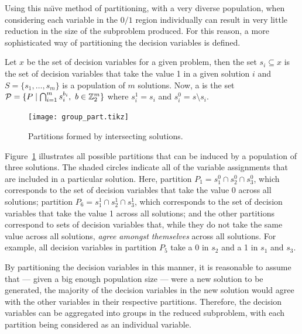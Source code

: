 \documentclass[journal]{IEEEtran}
\begin{document}
Using this na{\"\i}ve method of partitioning, with a very diverse population, when considering each variable in the $0/1$ region individually can result in very little reduction in the size of the subproblem produced. For this reason, a more sophisticated way of partitioning the decision variables is defined.

\begin{definition}\label{prop:part}
Let $x$ be the set of decision variables for a given problem, then the set $s_i \subseteq x$ is the set of decision variables that take the value 1 in a given solution $i$ and $S = \{s_1,\dots,s_m\}$ is a population of $m$ solutions. Now, a  is the set ${\cal P} = \{P \mid \bigcap_{i=1}^{m} s^{b_i}_i,\ b \in \Bin^m\}$ %
where $s_i^1 = s_i$ and $s_i^0 = s \setminus s_i$.
\end{definition}

\begin{figure}[h!]
\centering
\texttt{[image: group\_part.tikz]}
\caption[Partitions formed by intersecting solutions]{Partitions formed by intersecting solutions.}
\label{fig:group_part}
\end{figure}

Figure~\ref{fig:group_part} illustrates all possible partitions that can be induced by a population of three solutions. The shaded circles indicate all of the variable assignments that are included in a particular solution. Here, partition $P_1=s^0_1 \cap s^0_2 \cap s^0_3$, which corresponds to the set of decision variables that take the value 0 across all solutions; partition $P_6=s^1_1 \cap s^1_2 \cap s^1_3$, which corresponds to the set of decision variables that take the value 1 across all solutions; and the other partitions correspond to sets of decision variables that, while they do not take the same value across all solutions, \emph{agree amongst themselves} across all solutions. For example, all decision variables in partition $P_5$ take a 0 in $s_2$ and a 1 in $s_1$ and $s_3$.
 
By partitioning the decision variables in this manner, it is reasonable to assume that --- given a big enough population size --- were a new solution to be generated, the majority of the decision variables in the new solution would agree with the other variables in their respective partitions. Therefore, the decision variables can be aggregated into groups in the reduced subproblem, with each partition being considered as an individual variable. 
\end{document}
